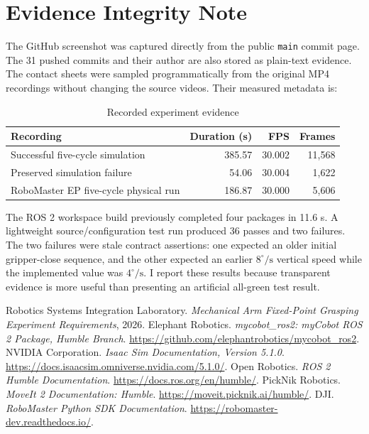 \documentclass[UTF8,zihao=-4,scheme=chinese,fontset=none]{ctexart}
\begin{document}
\section{Evidence Integrity Note}

The GitHub screenshot was captured directly from the public \texttt{main} commit page. The 31 pushed commits and their author are also stored as plain-text evidence. The contact sheets were sampled programmatically from the original MP4 recordings without changing the source videos. Their measured metadata is:
\begin{table}[H]
\centering
\caption{Recorded experiment evidence}
\begin{tabularx}{\textwidth}{Yrrr}
\toprule Recording & Duration (s) & FPS & Frames\\
\midrule
Successful five-cycle simulation & 385.57 & 30.002 & 11,568\\
Preserved simulation failure & 54.06 & 30.004 & 1,622\\
RoboMaster EP five-cycle physical run & 186.87 & 30.000 & 5,606\\
\bottomrule
\end{tabularx}
\end{table}

The ROS 2 workspace build previously completed four packages in 11.6 s. A lightweight source/configuration test run produced 36 passes and two failures. The two failures were stale contract assertions: one expected an older initial gripper-close sequence, and the other expected an earlier $8^{\circ}/\mathrm{s}$ vertical speed while the implemented value was $4^{\circ}/\mathrm{s}$. I report these results because transparent evidence is more useful than presenting an artificial all-green test result.

\begingroup\small\linespread{1.0}\selectfont
\begin{thebibliography}{9}
 Robotics Systems Integration Laboratory. \emph{Mechanical Arm Fixed-Point Grasping Experiment Requirements}, 2026.
 Elephant Robotics. \emph{mycobot\_ros2: myCobot ROS 2 Package, Humble Branch}. \url{https://github.com/elephantrobotics/mycobot_ros2}.
 NVIDIA Corporation. \emph{Isaac Sim Documentation, Version 5.1.0}. \url{https://docs.isaacsim.omniverse.nvidia.com/5.1.0/}.
 Open Robotics. \emph{ROS 2 Humble Documentation}. \url{https://docs.ros.org/en/humble/}.
 PickNik Robotics. \emph{MoveIt 2 Documentation: Humble}. \url{https://moveit.picknik.ai/humble/}.
 DJI. \emph{RoboMaster Python SDK Documentation}. \url{https://robomaster-dev.readthedocs.io/}.
\end{thebibliography}
\endgroup
\end{document}
